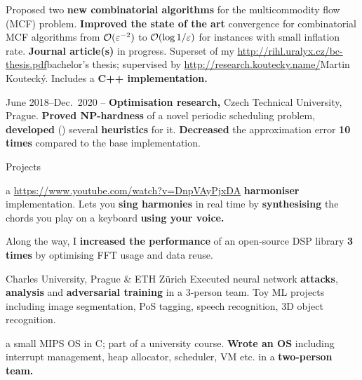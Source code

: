 %
\: Proposed two {\bf new combinatorial algorithms} for the multicommodity flow
(MCF) problem.
\: {\bf Improved the state of the art} convergence for combinatorial MCF
algorithms from ${\cal O}(\varepsilon^{-2})$ to ${\cal O}(\mathop{\hbox{log}} 1/\varepsilon)$ for
instances with small inflation rate.
%
%
\: {\bf Journal article(s)} in progress.
\: Superset of my \url{http://rihl.uralyx.cz/bc-thesis.pdf}{bachelor's thesis};
supervised by \url{http://research.koutecky.name/}{Martin Koutecký}.
Includes a {\bf C++ implementation.}%
\endlist

{\csc June 2018–Dec.~2020} –
{\bf Optimisation research,}
{\I %
Czech Technical University, Prague.}
%
%
\: {\bf Proved NP-hardness} of a novel periodic scheduling problem, {\bf
developed} (\Cpp) several {\bf heuristics} for it.
\:
{\bf Decreased} the approximation error {\bf 10 times} compared to the base implementation.

\endlist

\vskip -2mm

\sekce Projects

%
a \Cpp{} \url{https://www.youtube.com/watch?v=DnpVAyPjxDA}{{\bf
harmoniser}} implementation.
\: Lets you {\bf sing harmonies} in real time by {\bf synthesising} the
chords you play on a keyboard {\bf using your voice.}

\: Along the way, I {\bf increased the performance} of an
open-source DSP library {\bf 3 times} by optimising FFT usage and data reuse.

\endlist

 Charles University, Prague \& ETH Zürich
%
\: Executed neural network {\bf attacks}, {\bf analysis} and {\bf adversarial training} in a 3-person team.
\: Toy ML projects including image segmentation, PoS tagging, speech recognition, 3D object recognition.
\endlist


 a small MIPS OS in C; part of a university course.
%
\: {\bf Wrote an OS} including interrupt management, heap allocator,
scheduler, VM etc. in a {\bf two-person team.}
\endlist

